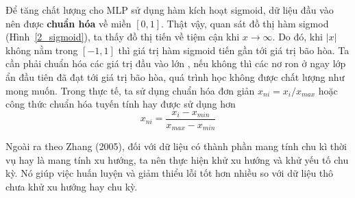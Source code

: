 Để tăng chất lượng cho MLP sử dụng hàm kích hoạt sigmoid, dữ liệu đầu vào nên được \textbf{chuẩn hóa} về miền $[0,1]$. Thật vậy, quan sát đồ thị hàm sigmod (Hình~\ref{2_sigmoid}), ta thấy đồ thị tiến về tiệm cận khi $x \rightarrow \infty $. Do đó, khi $|x|$  không nằm trong $[-1,1]$ thì giá trị hàm sigmoid tiến gần tới giá trị bão hòa. Ta cần phải chuẩn hóa các giá trị đầu vào lớn , nếu không thì các nơ ron ở ngay lớp ẩn đầu tiên đã đạt tới giá trị bão hòa, quá trình học không được chất lượng như mong muốn. Trong thực tế, ta sử dụng chuẩn hóa đơn giản $x_{ni} = x_i / x_{max}$ hoặc công thức chuẩn hóa tuyến tính hay được sử dụng hơn 
\[
	x_{ni} = \frac{x_i-x_{min}}{x_{max}-x_{min}}
\]

Ngoài ra theo Zhang (2005)\citep{Zhang05}, đối với dữ liệu có thành phần mang tính chu kì thời vụ hay là mang tính xu hướng, ta nên thực hiện khử xu hướng và khử yếu tố chu kỳ. Nó giúp việc huấn luyện và giảm thiểu lỗi tốt hơn nhiều so với dữ liệu thô chưa khử xu hướng hay chu kỳ.

